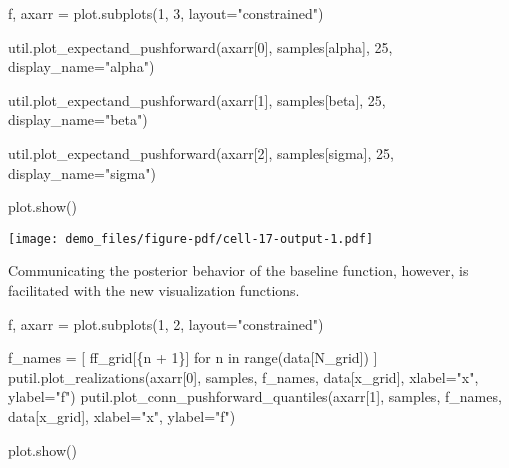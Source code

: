 \documentclass[
  letterpaper,
  DIV=11,
  numbers=noendperiod]{scrartcl}
\newenvironment{Shaded}{\begin{snugshade}}{\end{snugshade}}
\newcommand{\BuiltInTok}[1]{\textcolor[rgb]{0.00,0.23,0.31}{#1}}
\newcommand{\ControlFlowTok}[1]{\textcolor[rgb]{0.00,0.23,0.31}{#1}}
\newcommand{\DecValTok}[1]{\textcolor[rgb]{0.68,0.00,0.00}{#1}}
\newcommand{\KeywordTok}[1]{\textcolor[rgb]{0.00,0.23,0.31}{#1}}
\newcommand{\NormalTok}[1]{\textcolor[rgb]{0.00,0.23,0.31}{#1}}
\newcommand{\OperatorTok}[1]{\textcolor[rgb]{0.37,0.37,0.37}{#1}}
\newcommand{\SpecialCharTok}[1]{\textcolor[rgb]{0.37,0.37,0.37}{#1}}
\newcommand{\SpecialStringTok}[1]{\textcolor[rgb]{0.13,0.47,0.30}{#1}}
\newcommand{\StringTok}[1]{\textcolor[rgb]{0.13,0.47,0.30}{#1}}
\begin{document}
\begin{Shaded}
\begin{Highlighting}[]
\NormalTok{f, axarr }\OperatorTok{=}\NormalTok{ plot.subplots(}\DecValTok{1}\NormalTok{, }\DecValTok{3}\NormalTok{, layout}\OperatorTok{=}\StringTok{"constrained"}\NormalTok{)}

\NormalTok{util.plot\_expectand\_pushforward(axarr[}\DecValTok{0}\NormalTok{], samples[}\StringTok{\textquotesingle{}alpha\textquotesingle{}}\NormalTok{],}
                                \DecValTok{25}\NormalTok{, display\_name}\OperatorTok{=}\StringTok{"alpha"}\NormalTok{)}

\NormalTok{util.plot\_expectand\_pushforward(axarr[}\DecValTok{1}\NormalTok{], samples[}\StringTok{\textquotesingle{}beta\textquotesingle{}}\NormalTok{],}
                                \DecValTok{25}\NormalTok{, display\_name}\OperatorTok{=}\StringTok{"beta"}\NormalTok{)}

\NormalTok{util.plot\_expectand\_pushforward(axarr[}\DecValTok{2}\NormalTok{], samples[}\StringTok{\textquotesingle{}sigma\textquotesingle{}}\NormalTok{],}
                                \DecValTok{25}\NormalTok{, display\_name}\OperatorTok{=}\StringTok{"sigma"}\NormalTok{)}

\NormalTok{plot.show()}
\end{Highlighting}
\end{Shaded}

\texttt{[image: demo\_files/figure-pdf/cell-17-output-1.pdf]}

Communicating the posterior behavior of the baseline function, however,
is facilitated with the new visualization functions.

\begin{Shaded}
\begin{Highlighting}[]
\NormalTok{f, axarr }\OperatorTok{=}\NormalTok{ plot.subplots(}\DecValTok{1}\NormalTok{, }\DecValTok{2}\NormalTok{, layout}\OperatorTok{=}\StringTok{"constrained"}\NormalTok{)}

\NormalTok{f\_names }\OperatorTok{=}\NormalTok{ [ }\SpecialStringTok{f\textquotesingle{}f\_grid[}\SpecialCharTok{\{}\NormalTok{n }\OperatorTok{+} \DecValTok{1}\SpecialCharTok{\}}\SpecialStringTok{]\textquotesingle{}} \ControlFlowTok{for}\NormalTok{ n }\KeywordTok{in} \BuiltInTok{range}\NormalTok{(data[}\StringTok{\textquotesingle{}N\_grid\textquotesingle{}}\NormalTok{]) ]}
\NormalTok{putil.plot\_realizations(axarr[}\DecValTok{0}\NormalTok{], samples, f\_names, data[}\StringTok{\textquotesingle{}x\_grid\textquotesingle{}}\NormalTok{],}
\NormalTok{                        xlabel}\OperatorTok{=}\StringTok{"x"}\NormalTok{, ylabel}\OperatorTok{=}\StringTok{"f"}\NormalTok{)}
\NormalTok{putil.plot\_conn\_pushforward\_quantiles(axarr[}\DecValTok{1}\NormalTok{], samples,}
\NormalTok{                                      f\_names, data[}\StringTok{\textquotesingle{}x\_grid\textquotesingle{}}\NormalTok{],}
\NormalTok{                                      xlabel}\OperatorTok{=}\StringTok{"x"}\NormalTok{, ylabel}\OperatorTok{=}\StringTok{"f"}\NormalTok{)}

\NormalTok{plot.show()}
\end{Highlighting}
\end{Shaded}
\end{document}
